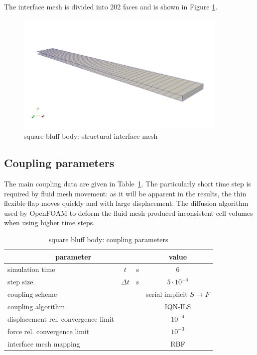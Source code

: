 The interface mesh is divided into 202 faces and is shown in Figure \ref{fig:sq_struct_mesh}. 

\begin{figure}[htbp!]
	\centering
	\includegraphics[width=0.9\textwidth, trim=0 50 0 200, clip]{images/sq-cyl/sq_struct_mesh.png}
	\caption{square bluff body: structural interface mesh}
	\label{fig:sq_struct_mesh}
\end{figure}


\subsection{Coupling parameters}

The main coupling data are given in Table~\ref{table:sq-coupling}. The particularly short time step is required by fluid mesh movement: as it will be apparent in the results, the thin flexible flap moves quickly and with large displacement. The diffusion algorithm used by OpenFOAM to deform the fluid mesh produced inconsistent cell volumes when using higher time steps. 

\begin{table}[!htb]
	\begin{center}
		\begin{tabular}{ l c  l| c } 
			\multicolumn{3}{c|}{parameter} & value   \\ 
			\hline
			simulation time  & $t$& \si{s} & 6      \\
			step size & $\Delta t$ & \si{s} & $5 \cdot 10^{-4}$   \\
			\hline
			coupling scheme & & & serial implicit  $S\rightarrow F$  \\
			coupling algorithm & & &  IQN-ILS  \\
			displacement rel. convergence limit & & & $10^{-4}$ \\
			force rel. convergence limit &&  & $10^{-3}$  \\
      		interface mesh mapping & & & RBF  \\
			
		\end{tabular}
	\end{center}
	\caption{square bluff body: coupling parameters}
	\label{table:sq-coupling}
\end{table}

